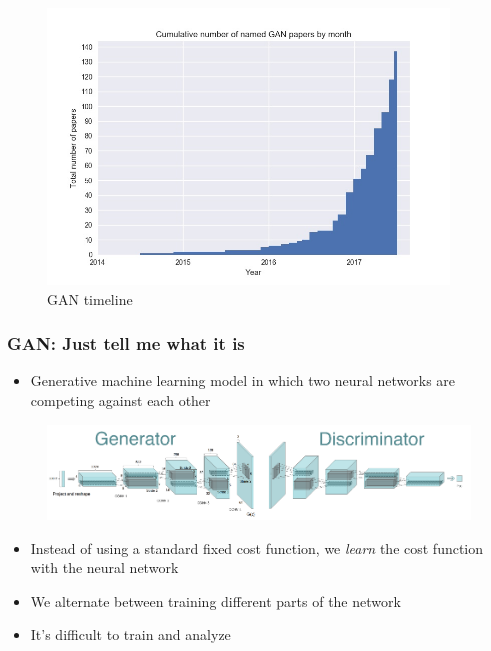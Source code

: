 \documentclass{beamer}
\begin{document}

\begin{frame}
\begin{figure}[h!]
	\centering
	\includegraphics[width=0.95\textwidth]{gan_timeline.jpg}
	\caption{GAN timeline}
	\label{fig:gan_timeline}
\end{figure}

\end{frame}


\begin{frame}
	\frametitle{GAN: Just tell me what it is}
	\begin{itemize}
		\item Generative machine learning model in which two neural networks are competing against each other
	\end{itemize}
\begin{figure}[h!]
	\centering
	\includegraphics[width=\textwidth]{dcgan_both.png}
\end{figure}
	\begin{itemize}
		\item Instead of using a standard fixed cost function, we \textit{learn} the cost function with the neural network
		\item We alternate between training different parts of the network
		\item It's difficult to train and analyze
	\end{itemize}
\end{frame}
\end{document}
